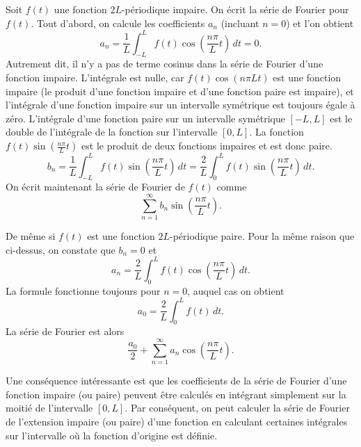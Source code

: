Soit $f(t)$ une fonction $2L$-périodique impaire.  On écrit la série de Fourier pour $f(t)$. Tout d'abord, on calcule les coefficients $a_n$ (incluant $n=0$) et l'on obtient
\begin{equation*}
a_n = \frac{1}{L} \int_{-L}^L f(t) \cos \left( \frac{n \pi}{L} t \right)
\, dt = 0 .
\end{equation*}
Autrement dit, il n'y a pas de terme cosinus dans la série de Fourier d'une fonction impaire.
L'intégrale est nulle, car $f(t) \cos \left( {n \pi}{L} t \right)$ est une fonction impaire (le produit d'une fonction impaire et d'une fonction paire est impaire), et l'intégrale d'une fonction impaire sur un intervalle symétrique est toujours égale à zéro. 
L'intégrale d'une fonction paire sur un intervalle symétrique $[-L,L]$ est le double de l'intégrale de la fonction sur l'intervalle $[0,L]$.
La fonction $f(t) \sin \left( \frac{n \pi}{L} t \right)$ est le produit de deux fonctions impaires et est donc paire.
\begin{equation*}
b_n = 
\frac{1}{L} \int_{-L}^L f(t) \sin \left( \frac{n \pi}{L} t \right) \, dt =
\frac{2}{L} \int_{0}^L f(t) \sin \left( \frac{n \pi}{L} t \right) \, dt .
\end{equation*}
On écrit maintenant la série de Fourier de $f(t)$ comme
\begin{equation*}
\sum_{n=1}^\infty b_n \sin \left( \frac{n \pi}{L} t \right) .
\end{equation*}

De même si $f(t)$ est une fonction  $2L$-périodique paire. Pour la même raison que ci-dessus, on constate que $b_n = 0$ et 
\begin{equation*}
a_n = 
\frac{2}{L} \int_{0}^L f(t) \cos \left( \frac{n \pi}{L} t \right) \, dt .
\end{equation*}
La formule fonctionne toujours pour $n=0$, auquel cas on obtient
\begin{equation*}
a_0 = 
\frac{2}{L} \int_{0}^L f(t) \, dt .
\end{equation*}
La série de Fourier est alors
\begin{equation*}
\frac{a_0}{2}
+
\sum_{n=1}^\infty a_n \cos \left( \frac{n \pi}{L} t \right) .
\end{equation*}

Une conséquence intéressante est que les coefficients de la série de Fourier d'une fonction impaire (ou paire) peuvent être calculés en intégrant simplement sur la moitié de l'intervalle $[0,L]$. Par conséquent, on peut calculer la série de Fourier de l'extension impaire (ou paire) d'une fonction en calculant certaines intégrales sur l'intervalle où la fonction d'origine est définie.

